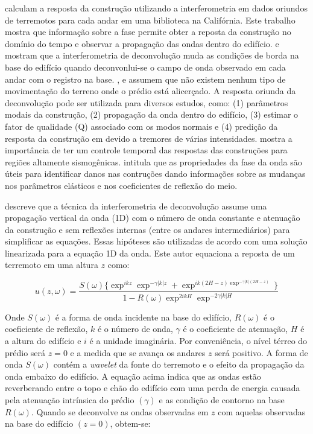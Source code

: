 \documentclass[paper,twocolumn]{geophysics}
\begin{document}
\cite{snieder_extracting_2006} calculam a resposta da construção utilizando a interferometria em dados oriundos de terremotos para cada andar em uma biblioteca na Califórnia. Este trabalho mostra que informação sobre a fase permite obter a reposta da construção no domínio do tempo e observar a propagação das ondas dentro do edifício. \cite{prieto_impulse_2010} e \cite{nakata_damage_2015} mostram que a interferometria de deconvolução muda as condições de borda na base do edifício quando deconvonlui-se o campo de onda observado em cada andar com o registro na base. \cite{snieder_extracting_2006}, \cite{prieto_impulse_2010} e \cite{nakata_damage_2015} assumem que não existem nenhum tipo de movimentação do terreno onde o prédio está alicerçado. A resposta oriunda da deconvolução pode ser utilizada para diversos estudos, como: (1) parâmetros modais da construção, (2) propagação da onda dentro do edifício, (3) estimar o fator de qualidade (Q) associado com os modos normais e (4) predição da resposta da construção em devido a tremores de várias intensidades. \cite{nakata_damage_2015} mostra a importância de ter um controle temporal das respostas das construções para regiões altamente sismogênicas. \cite{prieto_impulse_2010} intitula que as propriedades da fase da onda são úteis para identificar danos nas contruções dando informações sobre as mudanças nos parâmetros elásticos e nos coeficientes de reflexão do meio.

\cite{nakata_damage_2015} descreve que a técnica da interferometria de deconvolução assume uma propagação vertical da onda (1D) com o número de onda constante e atenuação da construção e sem reflexões internas (entre os andares intermediários) para simplificar as equações. Essas hipóteses são utilizadas de acordo com uma solução linearizada para a equação 1D da onda. Este autor equaciona a reposta de um terremoto em uma altura $z$ como:

\begin{equation}
u(z,\omega) = \frac{S(\omega) \{ \exp^{ikz}\exp^{-\gamma |k|z} + \exp^{ik(2H-z) \exp^{-\gamma |k| (2H-z)}} \}}{1 - R(\omega) \exp^{2ikH}\exp^{-2 \gamma |k| H} }
\end{equation}

Onde $S(\omega)$ é a forma de onda incidente na base do edifício, $R(\omega)$ é o coeficiente de reflexão, $k$ é o número de onda, $\gamma$ é o coeficiente de atenuação, $H$ é a altura do edifício e $i$ é a unidade imaginária. Por conveniência, o nível térreo do prédio será $z=0$ e a medida que se avança os andares $z$ será positivo. A forma de onda $S(\omega)$ contém a \textit{wavelet} da fonte do terremoto e o efeito da propagação da onda embaixo do edifício. A equação acima indica que as ondas estão reverberando entre o topo e chão do edifício com uma perda de energia causada pela atenuação intrínsica do prédio $(\gamma)$ e as condição de contorno na base $R(\omega)$.  Quando se deconvolve as ondas observadas em $z$ com aquelas observadas na base do edifício $(z=0)$, obtem-se:
\end{document}
